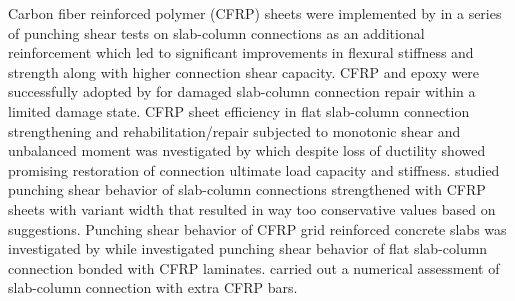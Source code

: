 Carbon fiber reinforced polymer (CFRP) sheets were implemented by \cite{harajli2003} in a series of punching shear tests on slab-column connections as an additional reinforcement which led to significant improvements in flexural stiffness and strength along with higher connection shear capacity. CFRP and epoxy were successfully adopted by \cite{robertson2004} for damaged slab-column connection repair within a limited damage state. CFRP sheet efficiency in flat slab-column connection strengthening and rehabilitation/repair subjected to monotonic shear and unbalanced moment was nvestigated by \cite{polies2010} which despite loss of ductility showed promising restoration of connection ultimate load capacity and stiffness. \cite{esfahani2009} studied punching shear behavior of slab-column connections strengthened with CFRP sheets with variant width that resulted in way too conservative values based on \cite{ACI31814} suggestions. Punching shear behavior of CFRP grid reinforced concrete slabs was investigated by \cite{huang2020} while \cite{abdullah2013,saleh2019,akhundzada2019} investigated punching shear behavior of flat slab-column connection bonded with CFRP laminates. \cite{hamoda2019} carried out a numerical assessment of slab-column connection with extra CFRP bars. 
